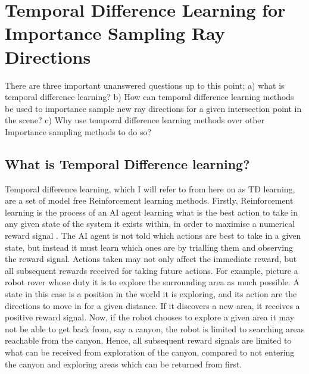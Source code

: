 \documentclass[ %
                    author={Callum Pearce},
                supervisor={Dr. Neill Campbell},
                    degree={MEng},
                     title={How effective are Temporal difference learning methods for reducing the number of zero contribution light paths while still accurately approximating Global Illumination in Path tracing?},
                  subtitle={},
                      type={research},
                      year={2019} ]{dissertation}
\begin{document}
\section{Temporal Difference Learning for Importance Sampling Ray Directions}

There are three important unanswered questions up to this point; a) what is temporal
difference learning?  b) How can temporal difference learning methods be 
used to importance sample new ray directions for a given intersection point in 
the scene? c) Why use temporal difference learning methods over other Importance 
sampling methods to do so? 

\subsection{What is Temporal Difference learning?}
Temporal difference learning, which I will refer to from 
here on as TD learning, are a set of model free Reinforcement learning methods. 
Firstly, Reinforcement learning is the process of an AI agent learning what is the 
best action to take in any given state of the system it exists within, in order to 
maximise a numerical reward signal \cite{sutton2011reinforcement}.
The AI agent is not told which actions are  best to take in a given state, but
 instead it must learn which ones are by trialling them and observing the reward 
signal. Actions taken may not only affect the immediate 
reward, but all subsequent rewards received for taking future actions. For 
example, picture a robot rover whose duty it is to explore the surrounding area 
as much possible. A state in this case is a position in the world it is exploring, 
and its action are the directions to move in for a given distance. If it discovers 
a new area, it receives a positive reward signal. Now, if the robot chooses to 
explore a given area it may not be able to get back from, say a canyon, the 
robot is limited to searching areas reachable from the canyon. Hence, all 
subsequent reward signals are limited to what can be received from exploration 
of the canyon, compared to not entering the canyon and exploring areas which 
can be returned from first.
\end{document}
